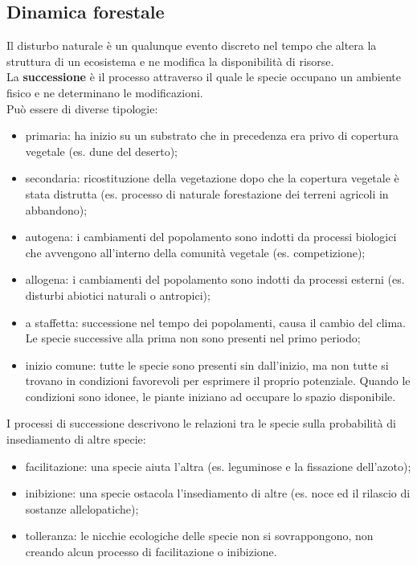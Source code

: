 \documentclass{article}
\begin{document}
\subsection{Dinamica forestale}
Il disturbo naturale è un qualunque evento discreto nel tempo che altera la struttura di un ecosistema e ne modifica la disponibilità di risorse.\\
La \textbf{successione} è il processo attraverso il quale le specie occupano un ambiente fisico e ne determinano le modificazioni.\\
Può essere di diverse tipologie:
\begin{itemize}
    \item primaria: ha inizio su un substrato che in precedenza era privo di copertura vegetale (es. dune del deserto);
    \item secondaria: ricostituzione della vegetazione dopo che la copertura vegetale è stata distrutta (es. processo di naturale forestazione dei terreni agricoli in abbandono);
    \item autogena: i cambiamenti del popolamento sono indotti da processi biologici che avvengono all'interno della comunità vegetale (es. competizione);
    \item allogena: i cambiamenti del popolamento sono indotti da processi esterni (es. disturbi abiotici naturali o antropici);
    \item a staffetta: successione nel tempo dei popolamenti, causa il cambio del clima. Le specie successive alla prima non sono presenti nel primo periodo;
    \item inizio comune: tutte le specie sono presenti sin dall'inizio, ma non tutte si trovano in condizioni favorevoli per esprimere il proprio potenziale. Quando le condizioni sono idonee, le piante iniziano ad occupare lo spazio disponibile. 
\end{itemize}
I processi di successione descrivono le relazioni tra le specie sulla probabilità di insediamento di altre specie:
\begin{itemize}
    \item facilitazione: una specie aiuta l'altra (es. leguminose e la fissazione dell'azoto);
    \item inibizione: una specie ostacola l'insediamento di altre (es. noce ed il rilascio di sostanze allelopatiche);
    \item tolleranza: le nicchie ecologiche delle specie non si sovrappongono, non creando alcun processo di facilitazione o inibizione.
\end{itemize}
\end{document}
